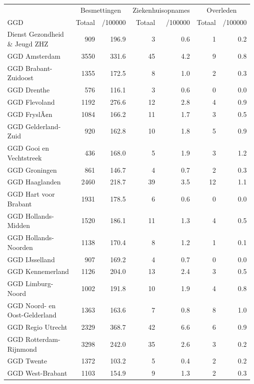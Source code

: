 \documentclass[
  english,
  man,floatsintext]{apa6}
\begin{document}
\begin{table}
\centering\begingroup\fontsize{10}{12}\selectfont

\begin{threeparttable}
\begin{tabular}{lrrrrrr}
\toprule
\multicolumn{1}{c}{ } & \multicolumn{2}{c}{Besmettingen} & \multicolumn{2}{c}{Ziekenhuisopnames} & \multicolumn{2}{c}{Overleden} \\
\cmidrule(l{3pt}r{3pt}){2-3} \cmidrule(l{3pt}r{3pt}){4-5} \cmidrule(l{3pt}r{3pt}){6-7}
GGD & Totaal & /100000 & Totaal & /100000 & Totaal & /100000\\
\midrule
Dienst Gezondheid \& Jeugd ZHZ & 909 & 196.9 & 3 & 0.6 & 1 & 0.2\\
GGD Amsterdam & 3550 & 331.6 & 45 & 4.2 & 9 & 0.8\\
GGD Brabant-Zuidoost & 1355 & 172.5 & 8 & 1.0 & 2 & 0.3\\
GGD Drenthe & 576 & 116.1 & 3 & 0.6 & 0 & 0.0\\
GGD Flevoland & 1192 & 276.6 & 12 & 2.8 & 4 & 0.9\\
GGD FryslÃ¢n & 1084 & 166.2 & 11 & 1.7 & 3 & 0.5\\
GGD Gelderland-Zuid & 920 & 162.8 & 10 & 1.8 & 5 & 0.9\\
GGD Gooi en Vechtstreek & 436 & 168.0 & 5 & 1.9 & 3 & 1.2\\
GGD Groningen & 861 & 146.7 & 4 & 0.7 & 2 & 0.3\\
GGD Haaglanden & 2460 & 218.7 & 39 & 3.5 & 12 & 1.1\\
GGD Hart voor Brabant & 1931 & 178.5 & 6 & 0.6 & 0 & 0.0\\
GGD Hollands-Midden & 1520 & 186.1 & 11 & 1.3 & 4 & 0.5\\
GGD Hollands-Noorden & 1138 & 170.4 & 8 & 1.2 & 1 & 0.1\\
GGD IJsselland & 907 & 169.2 & 4 & 0.7 & 0 & 0.0\\
GGD Kennemerland & 1126 & 204.0 & 13 & 2.4 & 3 & 0.5\\
GGD Limburg-Noord & 1002 & 191.8 & 10 & 1.9 & 4 & 0.8\\
GGD Noord- en Oost-Gelderland & 1363 & 163.6 & 7 & 0.8 & 8 & 1.0\\
GGD Regio Utrecht & 2329 & 368.7 & 42 & 6.6 & 6 & 0.9\\
GGD Rotterdam-Rijnmond & 3298 & 242.0 & 35 & 2.6 & 3 & 0.2\\
GGD Twente & 1372 & 103.2 & 5 & 0.4 & 2 & 0.2\\
GGD West-Brabant & 1103 & 154.9 & 9 & 1.3 & 2 & 0.3\\

\end{tabular}
\end{threeparttable}
\end{table}
\end{document}
